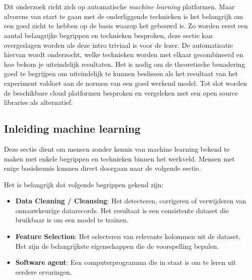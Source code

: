 \chapter{}
\label{ch:stand-van-zaken}



Dit onderzoek richt zich op automatische \textit{machine learning} platformen. Maar alvorens van start te gaan met de onderliggende technieken is het belangrijk om een goed zicht te hebben op de basis waarop het gebouwd is. Zo worden eerst een aantal belangrijke begrippen en technieken besproken, deze sectie kan overgeslagen worden als deze intro triviaal is voor de lezer. De automatisatie hiervan wordt onderzocht, welke technieken worden met elkaar gecombineerd en hoe bekom je uiteindelijk resultaten. Het is nodig om de theoretische benadering goed te begrijpen om uiteindelijk te kunnen beslissen als het resultaat van het experiment voldoet aan de normen van een goed werkend model. Tot slot worden de beschikbare cloud platformen besproken en vergeleken met een open source libraries als alternatief.

\section{Inleiding machine learning}
\label{sec:inl-machine-learning}

Deze sectie dient om mensen zonder kennis van machine learning bekend te maken met enkele begrippen en technieken binnen het werkveld. Mensen met enige basiskennis kunnen direct doorgaan naar de volgende sectie.

Het is belangrijk dat volgende begrippen gekend zijn:
\begin{itemize}
    \item \textbf{Data Cleaning / Cleansing}: Het detecteren, corrigeren of verwijderen van onnauwkeurige datarecords. Het resultaat is een consistente dataset die bruikbaar is om een model te trainen.
    \item \textbf{Feature Selection}: Het selecteren van relevante kolommen uit de dataset. Het zijn de belangrijkste eigenschappen die de voorspelling bepalen.
    \item \textbf{Software agent}: Een computerprogramma die in staat is om te leren uit eerdere ervaringen.
\end{itemize}

